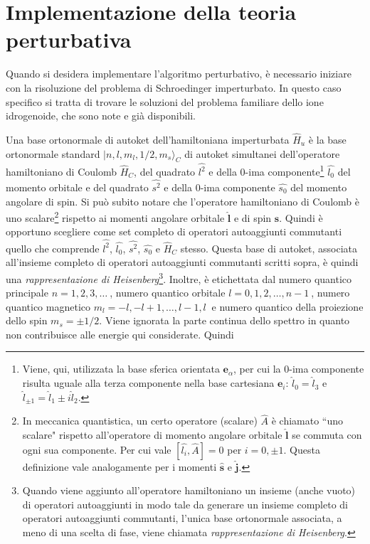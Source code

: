 \documentclass[12pt,a4paper]{report}
\numberwithin{equation}{section}
\numberwithin{section}{chapter}
\begin{document}
	\section{Implementazione della teoria perturbativa}\label{sec:impteo}
	Quando si desidera implementare l'algoritmo perturbativo, \`e necessario iniziare con la risoluzione del problema di Schroedinger imperturbato. In questo caso specifico si tratta di trovare le soluzioni del problema familiare dello ione idrogenoide, che sono note e gi\`a disponibili.
	
	Una base ortonormale di autoket dell'hamiltoniana imperturbata $\widehat{H}_u$ \`e la base ortonormale standard \mbox{$|n,l,m_l,1/2,m_s\rangle_C$} di autoket simultanei dell'operatore hamiltoniano di Coulomb $\widehat{H}_C$, del quadrato $\widehat{l^2}$ e della 0-ima componente\footnote{Viene, qui, utilizzata la base sferica orientata $\boldsymbol{e}_\alpha$, per cui la 0-ima componente risulta uguale alla terza componente nella base cartesiana $\boldsymbol{e}_i$: $\widehat{l}_0 = \widehat{l}_3$ e $\widehat{l}_{\pm1} = \widehat{l}_1 \pm i\widehat{l}_2$.} $\widehat{l_0}$ del momento orbitale  e del quadrato $\widehat{s^2}$ e della 0-ima componente $\widehat{s_0}$ del momento angolare di spin. Si pu\`o subito notare che l'operatore hamiltoniano di Coulomb \`e uno scalare\footnote{In meccanica quantistica, un certo operatore (scalare) $\widehat{A}$ \`e chiamato ``uno scalare" rispetto all'operatore di momento angolare orbitale $\widehat{\boldsymbol{l}}$ se commuta con ogni sua componente. Per cui vale $[\widehat{l_i},\widehat{A}] = 0$ per $i=0,\pm1$. Questa definizione vale analogamente per i momenti $\widehat{\boldsymbol{s}}$ e $\widehat{\boldsymbol{j}}$.} rispetto ai momenti angolare orbitale $\widehat{\boldsymbol{l}}$ e di spin $\widehat{\boldsymbol{s}}$. Quindi \`e opportuno scegliere come set completo di operatori autoaggiunti commutanti quello che comprende $\widehat{l^2}$, $\widehat{l_0}$, $\widehat{s^2}$, $\widehat{s_0}$ e $\widehat{H}_C$ stesso. Questa base di autoket, associata all'insieme completo di operatori autoaggiunti commutanti scritti sopra, \`e quindi una \textit{rappresentazione di Heisenberg}\footnote{Quando viene aggiunto all'operatore hamiltoniano un insieme (anche vuoto) di operatori autoaggiunti in modo tale da generare un insieme completo di operatori autoaggiunti commutanti, l'unica base ortonormale associata, a meno di una scelta di fase, viene chiamata \textit{rappresentazione di Heisenberg}.}. Inoltre, \`e etichettata dal numero quantico principale $n = 1,2,3,\dots~$, numero quantico orbitale $l=0,1,2,\dots,n-1~$, numero quantico magnetico $m_l=-l,-l+1,\dots,l-1,l~$ e numero quantico della proiezione dello spin $m_s=\pm1/2$. Viene ignorata la parte continua dello spettro in quanto non contribuisce alle energie qui considerate. Quindi
\end{document}
